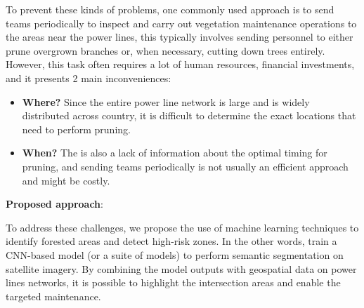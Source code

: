 To prevent these kinds of problems, one commonly used approach is to send teams periodically to inspect and carry out vegetation maintenance operations to the areas near the power lines, this typically involves sending personnel to either prune overgrown branches or, when necessary, cutting down trees entirely. However, this task often requires a lot of human resources, financial investments, and it presents 2 main inconveniences:\\

\begin{itemize}
\item \textbf{Where?} Since the entire power line network is large and is widely distributed across country, it is difficult to determine the exact locations that need to perform pruning.
\item \textbf{When?} The is also a lack of information about the optimal timing for pruning, and sending teams periodically is not usually an efficient approach and might be costly.
\end{itemize}



\textbf{Proposed approach}: 

To address these challenges, we propose the use of machine learning techniques to identify forested areas and detect high-risk zones. In the other words, train a CNN-based model (or a suite of models) to perform semantic segmentation on satellite imagery. By combining the model outputs with geospatial data on power lines networks, it is possible to highlight the intersection areas and enable the targeted maintenance. 





